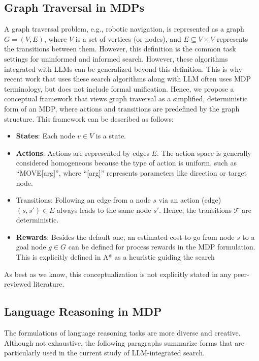 \subsection{Graph Traversal in MDPs}
\label{sec:graph}
A graph traversal problem, e.g., robotic navigation, is represented as a graph $G=(V, E)$, where $V$ is a set of vertices (or nodes), and $E \subseteq V \times V$ represents the transitions between them.
However, this definition is the common task settings for uninformed and informed search. However, these algorithms integrated with LLMs can be generalized beyond this definition. This is why recent work \citep{yao2023tree} that uses these search algorithms along with LLM often uses MDP terminology, but does not include formal unification. 
Hence, we propose a conceptual framework that views graph traversal as a simplified, deterministic form of an MDP, where actions and transitions are predefined by the graph structure.
This framework can be described as follows: 
\begin{itemize}
    \item \textbf{States}: Each node $v \in V$ is a state.
    
    \item \textbf{Actions}: Actions are represented by edges $E$. The action space is generally considered homogeneous because the type of action is uniform, such as ``MOVE[arg]'', where ``[arg]'' represents parameters like direction or target node.
    \item Transitions: Following an edge from a node $s$ via an action (edge) $(s, s') \in E$ always leads to the same node $s'$. Hence, the transitions $\mathcal{T}$ are deterministic.
    
    \item \textbf{Rewards}: Besides the default one,
    an estimated cost-to-go from node $s$ to a goal node $g \in G$ can be defined for process rewards in the MDP formulation. This is explicitly defined in A* as a heuristic guiding the search
\end{itemize}
As best as we know, this conceptualization is not explicitly stated in any peer-reviewed literature.
 
\subsection{Language Reasoning in MDP}
\label{sec:reasoning}
The formulations of language reasoning tasks are more diverse and creative. Although not exhaustive, the following paragraphs summarize forms that are particularly used in the current study of LLM-integrated search.

